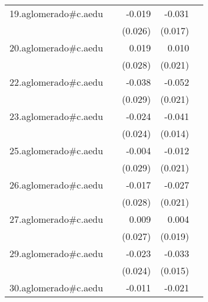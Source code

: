{\begin{longtable}{l*{4}{D{.}{.}{-1}}}
\addlinespace
19.aglomerado#c.aedu&                     &      -0.019         &      -0.031         &                     \\
            &                     &     (0.026)         &     (0.017)         &                     \\
\addlinespace
20.aglomerado#c.aedu&                     &       0.019         &       0.010         &                     \\
            &                     &     (0.028)         &     (0.021)         &                     \\
\addlinespace
22.aglomerado#c.aedu&                     &      -0.038         &      -0.052\sym{*}  &                     \\
            &                     &     (0.029)         &     (0.021)         &                     \\
\addlinespace
23.aglomerado#c.aedu&                     &      -0.024         &      -0.041\sym{**} &                     \\
            &                     &     (0.024)         &     (0.014)         &                     \\
\addlinespace
25.aglomerado#c.aedu&                     &      -0.004         &      -0.012         &                     \\
            &                     &     (0.029)         &     (0.021)         &                     \\
\addlinespace
26.aglomerado#c.aedu&                     &      -0.017         &      -0.027         &                     \\
            &                     &     (0.028)         &     (0.021)         &                     \\
\addlinespace
27.aglomerado#c.aedu&                     &       0.009         &       0.004         &                     \\
            &                     &     (0.027)         &     (0.019)         &                     \\
\addlinespace
29.aglomerado#c.aedu&                     &      -0.023         &      -0.033\sym{*}  &                     \\
            &                     &     (0.024)         &     (0.015)         &                     \\
\addlinespace
30.aglomerado#c.aedu&                     &      -0.011         &      -0.021         &                     \\

\end{longtable}}
